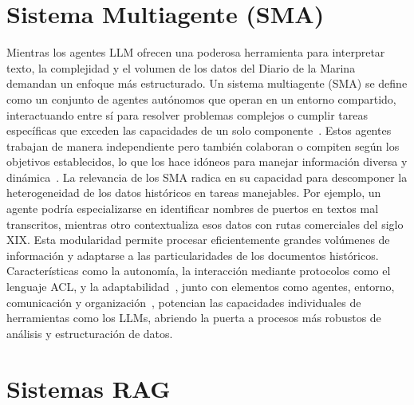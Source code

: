 \section{Sistema Multiagente (SMA)}\label{seq_2}

Mientras los agentes LLM ofrecen una poderosa herramienta para interpretar texto, la complejidad y el volumen de los datos del Diario de la Marina demandan un enfoque más estructurado. Un sistema multiagente (SMA) se define como un conjunto de agentes autónomos que operan en un entorno compartido, interactuando entre sí para resolver problemas complejos o cumplir tareas específicas que exceden las capacidades de un solo componente~\cite{zambrano2020multiagent}. Estos agentes trabajan de manera independiente pero también colaboran o compiten según los objetivos establecidos, lo que los hace idóneos para manejar información diversa y dinámica~\cite{perezpons2021brief}.
La relevancia de los SMA radica en su capacidad para descomponer la heterogeneidad de los datos históricos en tareas manejables. Por ejemplo, un agente podría especializarse en identificar nombres de puertos en textos mal transcritos, mientras otro contextualiza esos datos con rutas comerciales del siglo XIX. Esta modularidad permite procesar eficientemente grandes volúmenes de información y adaptarse a las particularidades de los documentos históricos. Características como la autonomía, la interacción mediante protocolos como el lenguaje ACL, y la adaptabilidad~\cite{perezpons2021brief}, junto con elementos como agentes, entorno, comunicación y organización~\cite{zambrano2020multiagent}, potencian las capacidades individuales de herramientas como los LLMs, abriendo la puerta a procesos más robustos de análisis y estructuración de datos.

\section{Sistemas RAG}\label{seq_4}

